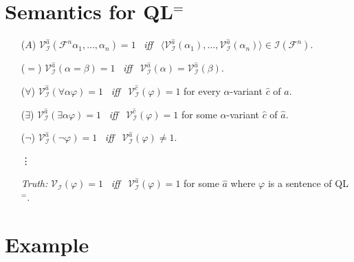 \documentclass[a4paper, 11pt]{article} %
\newcommand{\tuple}[1]{\langle#1\rangle} %
\newcommand{\I}{\mathcal{I}}
\newcommand{\F}{\mathcal{F}}
\newcommand{\VV}[2]{\mathcal{V}_{#1}^{#2}} %
\begin{document}
\section*{Semantics for QL$^=$}

\begin{enumerate}
  \item[($A$)] $\VV{\I}{\hat{a}}(\F^n\alpha_1,\ldots,\alpha_n)=1$ ~\textit{iff}~ $\tuple{\VV{\I}{\hat{a}}{(\alpha_1)},\ldots,\VV{\I}{\hat{a}}{(\alpha_n)}}\in\I(\F^n)$.
  \item[($=$)] $\VV{\I}{\hat{a}}(\alpha=\beta)=1$ ~\textit{iff}~ $\VV{\I}{\hat{a}}(\alpha)=\VV{\I}{\hat{a}}(\beta)$.
  \item[(\hspace{1pt}$\forall$\hspace{1pt})] $\VV{\I}{\hat{a}}(\forall\alpha\varphi)=1$ ~\textit{iff}~ $\VV{\I}{\hat{c}}(\varphi)=1$ for every $\alpha$-variant $\hat{c}$ of $\hat{a}$.
  \item[(\hspace{1pt}$\exists$\hspace{1pt})] $\VV{\I}{\hat{a}}(\exists\alpha\varphi)=1$ ~\textit{iff}~ $\VV{\I}{\hat{c}}(\varphi)=1$ for some $\alpha$-variant $\hat{c}$ of $\hat{a}$.
  \item[($\neg$)] $\VV{\I}{\hat{a}}(\neg\varphi)=1$ ~\textit{iff}~ $\VV{\I}{\hat{a}}(\varphi)\neq 1$.
  \item[\vdots] 
    \vspace{.1in}
  \item[\it Truth:] $\VV{\I}{}(\varphi)=1$ ~\textit{iff}~ $\VV{\I}{\hat{a}}(\varphi)=1$ for some $\hat{a}$ where $\varphi$ is a sentence of QL$^=$. 
\end{enumerate}




\section*{Example}
\end{document}
